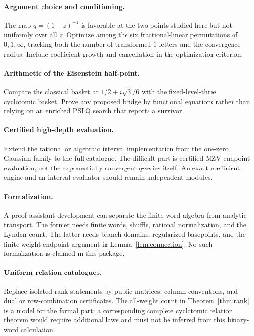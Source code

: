 \documentclass[11pt]{article}
\numberwithin{equation}{section}
\theoremstyle{definition}\newtheorem{definition}[theorem]{Definition}
\theoremstyle{remark}\newtheorem{remark}[theorem]{Remark}
\begin{document}
\paragraph{Argument choice and conditioning.}
The map $q=(1-z)^{-1}$ is favorable at the two points studied here but
not uniformly over all $z$. Optimize among the six fractional-linear
permutations of $0,1,\infty$, tracking both the number of transformed
$1$ letters and the convergence radius. Include coefficient growth
and cancellation in the optimization criterion.

\paragraph{Arithmetic of the Eisenstein half-point.}
Compare the classical basket at $1/2+i\sqrt3/6$ with the fixed-level-three
cyclotomic basket. Prove any proposed bridge by functional equations
rather than relying on an enriched PSLQ search that reports a survivor.

\paragraph{Certified high-depth evaluation.}
Extend the rational or algebraic interval implementation from the
one-zero Gaussian family to the full catalogue. The difficult part is
certified MZV endpoint evaluation, not the exponentially convergent
$q$-series itself. An exact coefficient engine and an interval evaluator
should remain independent modules.

\paragraph{Formalization.}
A proof-assistant development can separate the finite word algebra from
analytic transport. The former needs finite words, shuffle, rational
normalization, and the Lyndon count. The latter needs branch domains,
regularized basepoints, and the finite-weight endpoint argument in
Lemma~\ref{lem:connection}. No such formalization is claimed in this
package.

\paragraph{Uniform relation catalogues.}
Replace isolated rank statements by public matrices, column conventions,
and dual or row-combination certificates. The all-weight count in
Theorem~\ref{thm:rank} is a model for the formal part; a corresponding
complete cyclotomic relation theorem would require additional laws and
must not be inferred from this binary-word calculation.
\end{document}
